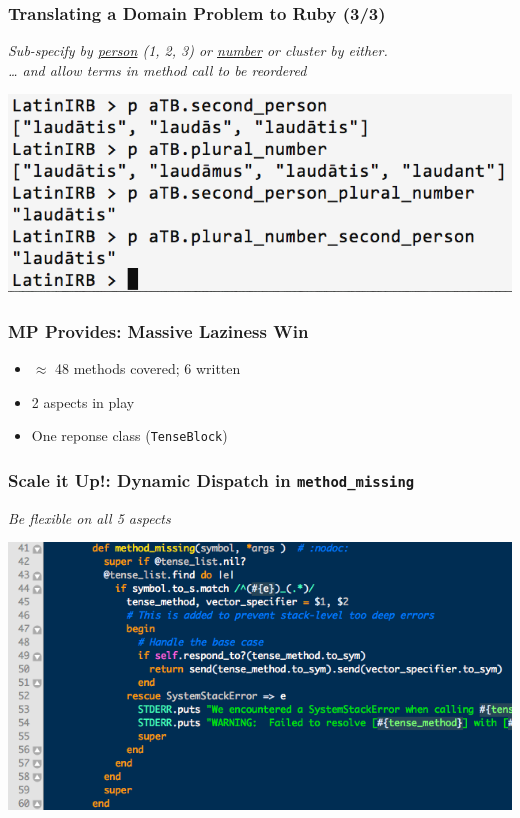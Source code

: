 \documentclass[slidestop,compress,mathserif]{beamer}
\begin{document}
\begin{frame}
	\frametitle{Translating a Domain Problem to Ruby (3/3)}
	\emph{
		Sub-specify by \underline{person} (1, 2, 3) or \underline{number} or
    cluster by either. \\
		\pause
		{\ldots} and allow terms in method call to be reordered
  }
	\vskip 0.5cm
	\begin{center}
		\includegraphics[scale=0.38]{img/conj_subspec.png}
	\end{center}
\end{frame}

\begin{frame}
	\frametitle{MP Provides:  Massive Laziness Win}
	\begin{itemize}
		\item $\approx$ 48 methods covered; 6 written
		\pause
		\item 2 aspects in play
		\pause
		\item One reponse class (\texttt{TenseBlock})
	\end{itemize}
\end{frame}

\begin{frame}
	\frametitle{Scale it Up!: Dynamic Dispatch in \texttt{method\_missing}}
	\begin{center}
		\emph{Be flexible on all 5 aspects}
	\end{center}
	\includegraphics[scale=0.45]{img/lv_mm.png}
\end{frame}
\end{document}
